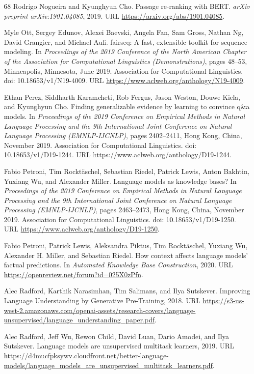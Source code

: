\documentclass[10pt,letterpaper]{article}
\begin{document}
{\begin{thebibliography}{68}
 Rodrigo Nogueira and Kyunghyun Cho. Passage re-ranking with BERT.
\emph{arXiv preprint arXiv:1901.04085}, 2019. URL
\url{https://arxiv.org/abs/1901.04085}.

 Myle Ott, Sergey Edunov, Alexei Baevski, Angela Fan, Sam Gross,
Nathan Ng, David Grangier, and Michael Auli. fairseq: A fast, extensible
toolkit for sequence modeling. In \emph{Proceedings of the 2019 Conference of
the North American Chapter of the Association for Computational Linguistics
(Demonstrations)}, pages 48--53, Minneapolis, Minnesota, June 2019. Association
for Computational Linguistics. doi: 10.18653/v1/N19-4009. URL
\url{https://www.aclweb.org/anthology/N19-4009}.

 Ethan Perez, Siddharth Karamcheti, Rob Fergus, Jason Weston,
Douwe Kiela, and Kyunghyun Cho. Finding generalizable evidence by learning to
convince q\&a models. In \emph{Proceedings of the 2019 Conference on Empirical
Methods in Natural Language Processing and the 9th International Joint
Conference on Natural Language Processing (EMNLP-IJCNLP)}, pages 2402--2411,
Hong Kong, China, November 2019. Association for Computational Linguistics.
doi: 10.18653/v1/D19-1244. URL
\url{https://www.aclweb.org/anthology/D19-1244}.

 Fabio Petroni, Tim Rocktäschel, Sebastian Riedel, Patrick Lewis,
Anton Bakhtin, Yuxiang Wu, and Alexander Miller. Language models as knowledge
bases? In \emph{Proceedings of the 2019 Conference on Empirical Methods in
Natural Language Processing and the 9th International Joint Conference on
Natural Language Processing (EMNLP-IJCNLP)}, pages 2463--2473, Hong Kong,
China, November 2019. Association for Computational Linguistics. doi:
10.18653/v1/D19-1250. URL \url{https://www.aclweb.org/anthology/D19-1250}.

 Fabio Petroni, Patrick Lewis, Aleksandra Piktus, Tim Rocktäschel,
Yuxiang Wu, Alexander H. Miller, and Sebastian Riedel. How context affects
language models' factual predictions. In \emph{Automated Knowledge Base
Construction}, 2020. URL \url{https://openreview.net/forum?id=025X0zPfn}.

 Alec Radford, Karthik Narasimhan, Tim Salimans, and Ilya
Sutskever. Improving Language Understanding by Generative Pre-Training, 2018.
URL
\url{https://s3-us-west-2.amazonaws.com/openai-assets/research-covers/language-unsupervised/language_understanding_paper.pdf}.

 Alec Radford, Jeff Wu, Rewon Child, David Luan, Dario Amodei, and
Ilya Sutskever. Language models are unsupervised multitask learners, 2019. URL
\url{https://d4mucfpksywv.cloudfront.net/better-language-models/language_models_are_unsupervised_multitask_learners.pdf}.


\end{thebibliography}}
\end{document}
